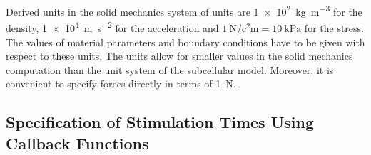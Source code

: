 Derived units in the solid mechanics system of units are \SI{1e2}{\kilogram\per\meter\cubed} for the density, \SI{1e4}{\meter\per\square\second} for the acceleration and $\SI{1}{\newton\per\square\centi\meter} = \SI{10}{\kilo\pascal}$ for the stress. The values of material parameters and boundary conditions have to be given with respect to these units.
The units allow for smaller values in the solid mechanics computation than the unit system of the subcellular model. Moreover, it is  convenient to specify forces directly in terms of \SI{1}{\newton}.

% 
% 
% 
% 

\subsection{Specification of Stimulation Times Using Callback Functions}\label{sec:stimulation_times_callbacks}

